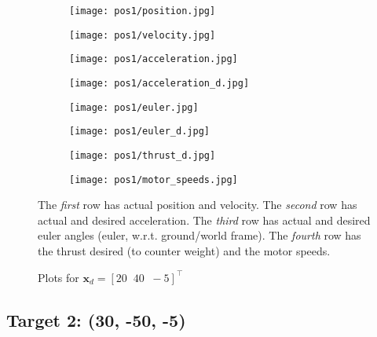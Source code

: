 \begin{figure}[h]
    \centering
    \begin{subfigure}[b]{0.35\textwidth}
        \texttt{[image: pos1/position.jpg]}
    \end{subfigure}
    \begin{subfigure}[b]{0.35\textwidth}
        \texttt{[image: pos1/velocity.jpg]}
    \end{subfigure}
    \begin{subfigure}[b]{0.35\textwidth}
        \texttt{[image: pos1/acceleration.jpg]}
    \end{subfigure}
    \begin{subfigure}[b]{0.35\textwidth}
        \texttt{[image: pos1/acceleration\_d.jpg]}
    \end{subfigure}
    \begin{subfigure}[b]{0.35\textwidth}
        \texttt{[image: pos1/euler.jpg]}
    \end{subfigure}
    \begin{subfigure}[b]{0.35\textwidth}
        \texttt{[image: pos1/euler\_d.jpg]}
    \end{subfigure}
    \begin{subfigure}[b]{0.35\textwidth}
        \texttt{[image: pos1/thrust\_d.jpg]}
    \end{subfigure}
    \begin{subfigure}[b]{0.35\textwidth}
        \texttt{[image: pos1/motor\_speeds.jpg]}
    \end{subfigure}
    \caption{Plots for $\mathbf{x}_d = [20\;\;40\;\;-5]^\top$}
    \small
        The \emph{first} row has actual position and velocity.
        The \emph{second} row has actual and desired acceleration.
        The \emph{third} row has actual and desired euler angles (euler, w.r.t. ground/world frame).
        The \emph{fourth} row has the thrust desired (to counter weight) and the motor speeds.
\end{figure}

\pagebreak
\subsection{Target 2: (30, -50, -5)}

